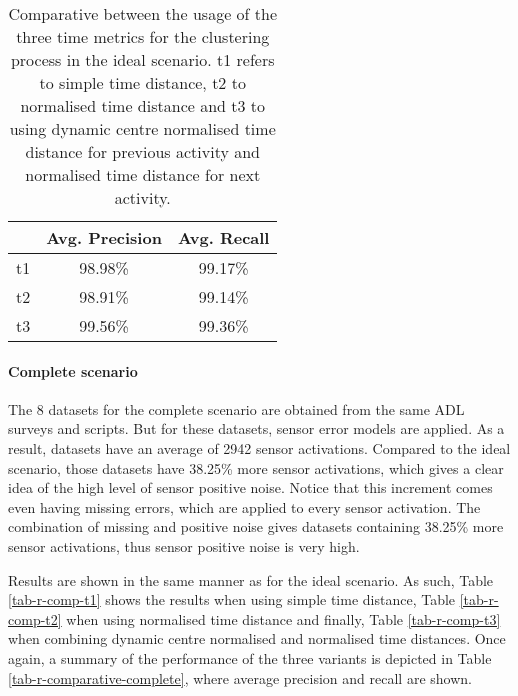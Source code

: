 \begin{table}[htbp]\scriptsize
\begin{center}
 \begin{tabular}{ccc}
  \hline
   & Avg. Precision & Avg. Recall \\
  \hline
  t1 & 98.98\% & 99.17\% \\
  t2 & 98.91\% & 99.14\% \\
  t3 & 99.56\% & 99.36\% \\
  \hline
 \end{tabular}
 \caption{Comparative between the usage of the three time metrics for the clustering process in the ideal scenario. t1 refers to simple time distance, t2 to normalised time distance and t3 to using dynamic centre normalised time distance for previous activity and normalised time distance for next activity.}
 \label{tab-r-comparative-ideal}
\end{center} 
\end{table}

\paragraph*{Complete scenario}

The 8 datasets for the complete scenario are obtained from the same ADL surveys and scripts. But for these datasets, sensor error models are applied. As a result, datasets have an average of 2942 sensor activations. Compared to the ideal scenario, those datasets have 38.25\% more sensor activations, which gives a clear idea of the high level of sensor positive noise. Notice that this increment comes even having missing errors, which are applied to every sensor activation. The combination of missing and positive noise gives datasets containing 38.25\% more sensor activations, thus sensor positive noise is very high. 

Results are shown in the same manner as for the ideal scenario. As such, Table \ref{tab-r-comp-t1} shows the results when using simple time distance, Table \ref{tab-r-comp-t2} when using normalised time distance and finally, Table \ref{tab-r-comp-t3} when combining dynamic centre normalised and normalised time distances. Once again, a summary of the performance of the three variants is depicted in Table \ref{tab-r-comparative-complete}, where average precision and recall are shown.
       
